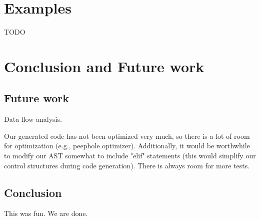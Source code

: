 \documentclass{article}
\begin{document}
\section{Examples}

TODO

\section{Conclusion and Future work}

\subsection{Future work}
Data flow analysis.

Our generated code has not been optimized very much, so there is a lot of room for optimization (e.g., peephole optimizer). Additionally, it would be worthwhile to modify our AST somewhat to include "elif" statements (this would simplify our control structures during code generation). There is always room for more tests.

\subsection{Conclusion}

This was fun. We are done.
\end{document}
